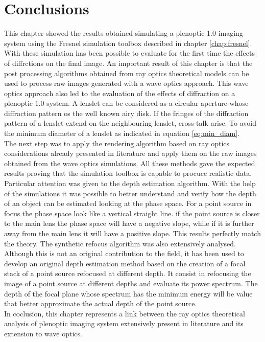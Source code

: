 \section{Conclusions}
This chapter showed the results obtained simulating a plenoptic 1.0 imaging system using the Fresnel simulation toolbox described in chapter \ref{chap:fresnel}. With these simulation has been possible to evaluate for the first time the effects of diffrctions on the final image. An important result of this chapter is that the post processing algorithms obtained from ray optics theoretical models can be used to process raw images generated with a wave optics approach. This wave optics approach also led to the evaluation of the effects of diffraction on a plenoptic 1.0 system. A lenslet can be considered as a circular aperture whose diffraction pattern os the well known airy disk. If the fringes of the diffraction pattern of a lenslet extend on the neighbouring lenslet, cross-talk arise. To avoid the minimum diameter of a lenslet as indicated in equation \ref{eq:min_diam}.\\
The next step was to apply the rendering algorithm based on ray optics considerations already presented in literature and apply them on the raw images obtained from the wave optics simulations. All these methods gave the expected results proving that the simulation toolbox is capable to procuce realistic data. Particular attention was given to the depth estimation algorithm. With the help of the simulations it was possible to better understand and verify how the depth of an object can be estimated looking at the phase space. For a point source in focus the phase space look like a vertical straight line. if the point source is closer to the main lens the phase space will have a negative slope, while if it is further away from the main lens it will have a positive slope. This results perfectly match the theory. The synthetic refocus algorithm was also extensively analysed. Although this is not an original contribution to the field, it has been used to develop an original depth estimation method based on the creation of a focal stack of a point source refocused at different depth. It consist in refocusing the image of a point source at different depths and evaluate its power spectrum. The depth of the focal plane whose spectrum has the minimum energy will be value that better approximate the actual depth of the point source.\\
In coclusion, this chapter represents a link between the ray optics theoretical analysis of plenoptic imaging system extensively present in literature and its extension to wave optics. 
